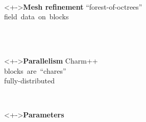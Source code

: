 \begin{frame}[fragile,label=ss-state]
\pause
\begin{center}
\begin{minipage}{4.5in}
\begin{minipage}{2.9in}
\end{minipage} \ 
\begin{minipage}{1.45in}
\end{minipage}
\end{minipage}
\end{center}
\pause
\pause
\begin{minipage}[t]{1.2in}
\footnotesize
\vspace{0.1in}
\blockred
\begin{block}<+->{\textbf{Mesh refinement}}
\scriptsize
 \mbox{``forest-of-octrees''} \\
 \mbox{field data on blocks} \\ \ \\
\end{block}
\end{minipage} \ \ 
\begin{minipage}[t]{1.0in}
\footnotesize
\vspace{0.1in}
\blockgreen
\begin{block}<+->{\textbf{Parallelism}}
\scriptsize
 Charm++\\
\mbox{blocks are ``chares''} \\
 \mbox{fully-distributed}
\end{block}
\end{minipage} \ \
\begin{minipage}[t]{1.6in}
\raggedright
\footnotesize
\vspace{0.1in}
\blockblue
\begin{block}<+->{\textbf{Parameters}}
\scriptsize
 \mbox{} \\
 \mbox{\code{ value = [ 1.5, "daze.png",  }} \\
 \mbox{\code{\ \ \ \ \ \ \ \ \ \ \ 0.125 ]; \} \} }}
\end{block}
\end{minipage}

\end{frame}

